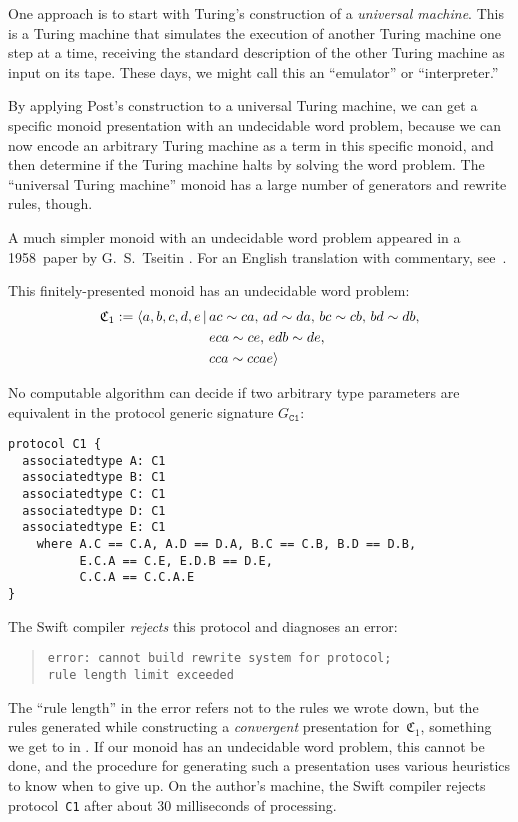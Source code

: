\documentclass[../generics]{subfiles}
\begin{document}
One approach is to start with Turing's construction of a \emph{universal machine}. This is a Turing machine that simulates the execution of another Turing machine one step at a time, receiving the standard description of the other Turing machine as input on its tape. These days, we might call this an ``emulator'' or ``interpreter.''

By applying Post's construction to a universal Turing machine, we can get a specific monoid presentation with an undecidable word problem, because we can now encode an arbitrary Turing machine as a term in this specific monoid, and then determine if the Turing machine halts by solving the word problem. The ``universal Turing machine'' monoid has a large number of generators and rewrite rules, though.

A much simpler monoid with an undecidable word problem appeared in a 1958~paper by G.~S.~Tseitin \cite{undecidablesemigroup}. For an English translation with commentary, see~\cite{nybergbrodda2024g}.

\newcommand{\Ts}{\mathfrak{C}_1}

\begin{theorem}\label{undecidablemonoid}
This finitely-presented monoid has an undecidable word problem:
\begin{align*}
\Ts := \Pres{a,b,c,d,e}{&ac\sim ca,\,ad\sim da,\,bc\sim cb,\,bd\sim db,\\
&eca\sim ce,\,edb\sim de,\\
&cca\sim ccae}
\end{align*}
\end{theorem}
\begin{corollary}
No computable algorithm can decide if two arbitrary type parameters are equivalent in the protocol generic signature $G_\texttt{C1}$:
\begin{Verbatim}
protocol C1 {
  associatedtype A: C1
  associatedtype B: C1
  associatedtype C: C1
  associatedtype D: C1
  associatedtype E: C1
    where A.C == C.A, A.D == D.A, B.C == C.B, B.D == D.B,
          E.C.A == C.E, E.D.B == D.E,
          C.C.A == C.C.A.E
}
\end{Verbatim}
The Swift compiler \emph{rejects} this protocol and diagnoses an error:
\begin{quote}
\begin{verbatim}
error: cannot build rewrite system for protocol;
rule length limit exceeded
\end{verbatim}
\end{quote}
The ``rule length'' in the error refers not to the rules we wrote down, but the rules generated while constructing a \emph{convergent} presentation for~$\Ts$, something we get to in . If our monoid has an undecidable word problem, this cannot be done, and the procedure for generating such a presentation uses various heuristics to know when to give up. On the author's machine, the Swift compiler rejects protocol~\texttt{C1} after about 30 milliseconds of processing.
\end{corollary}
\end{document}
